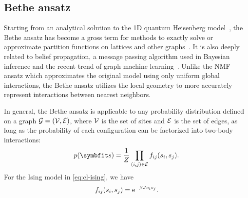\subsection{Bethe ansatz}
\label{sec:bethe}

Starting from an analytical solution to the 1D quantum Heisenberg model~\cite{bethe1931theorie}, the Bethe ansatz has become a gross term for methods to exactly solve or approximate partition functions on lattices and other graphs~\cite{baxter1995solvable, caravelli2022some, gujrati1995bethe, mezard2001bethe}. It is also deeply related to belief propagation, a message passing algorithm used in Bayesian inference and the recent trend of graph machine learning~\cite{yedidia2003understanding, ikeda2004stochastic}. Unlike the NMF ansatz which approximates the original model using only uniform global interactions, the Bethe ansatz utilizes the local geometry to more accurately represent interactions between nearest neighbors.

In general, the Bethe ansatz is applicable to any probability distribution defined on a graph $\mathcal{G} = (\mathcal{V}, \mathcal{E})$, where $\mathcal{V}$ is the set of sites and $\mathcal{E}$ is the set of edges, as long as the probability of each configuration can be factorized into two-body interactions:
\begin{equation}
p(\vs) = \frac{1}{Z} \prod_{(i, j) \in \calE} f_{i j}(s_i, s_j).
\end{equation}
For the Ising model in \cref{eq:cl-ising}, we have
\begin{equation}
f_{i j}(s_i, s_j) = \mathrm{e}^{-\beta J s_i s_j}.
\end{equation}

